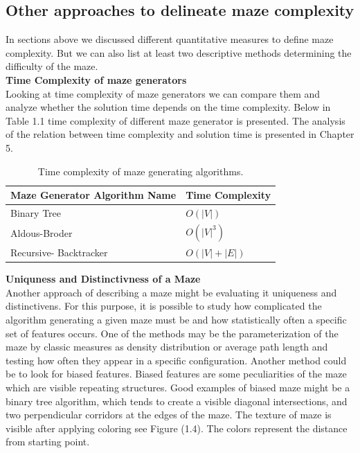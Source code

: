 \subsection{Other approaches to delineate maze complexity }
In sections above we discussed different quantitative measures to define maze complexity. But we can also list at least two  descriptive methods determining the difficulty of the maze.\\ \newline
\textbf{Time Complexity of maze generators}\\
Looking at time complexity of maze generators we can compare them and  analyze whether the solution time depends on the time complexity. Below in Table 1.1 time complexity of different maze generator is presented. The analysis of the relation between time complexity and solution time is presented in Chapter 5.\\
\begin{table}[!h]
\begin{center} 
\begin{tabular}{ |p{6cm}||p{3cm}| } 
\hline Maze Generator Algorithm Name& Time Complexity\\ \hline Binary Tree & $O(|V|)$\\ Aldous-Broder& $O(|V|^3)$ \\ 
Recursive- Backtracker& $O(|V|+|E|)$\\ 
\hline
 \end{tabular} 
\caption{\label{tab:table-name}Time complexity of maze generating algorithms.} 
\end{center}
 \end{table}
 \newline
\textbf{Uniquness and Distinctivness of a Maze}\\
Another approach of describing a maze might be evaluating it uniqueness and distinctivens. For this purpose, it is possible to study how complicated the algorithm generating a given maze must be and how statistically often a specific set of features occurs. One of the methods may be the parameterization of the maze by classic measures as density distribution or average path length and testing how often they appear in a specific configuration. Another method could be to look for biased features. Biased features are some peculiarities of the maze which are visible repeating structures.
Good examples of biased maze might be a binary tree algorithm, which tends to create a visible diagonal intersections, and two perpendicular corridors at the edges of the maze. The texture of maze is visible after applying coloring see Figure (1.4). The colors represent the distance from starting point. 

